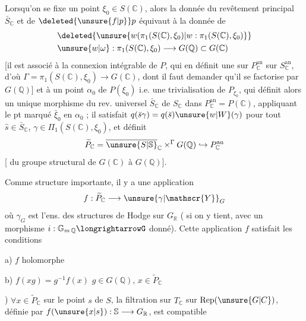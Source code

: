 Lorsqu'on se fixe un point $\xi_0\in S(\mathbb{C})$,\deleted{\unsure{$\xi$|,}} alors la donnée du revêtement principal $\bar S_{\mathbb{C}}$ et de $\deleted{\unsure{f|p}}p$ équivaut à la donnée de
\[
\begin{aligned}
&\deleted{\unsure{w(\pi_1(S(\mathbb{C}),\xi_0)|w:\pi_1(S(\mathbb{C}),\xi_0)}}\\
&\unsure{w|\omega}:\pi_1(S(\mathbb{C}),\xi_0)\longrightarrow G(\mathbb{Q})\subset G(\mathbb{C})
\end{aligned}
\]
[il est associé à la connexion intégrable de $P$, qui en définit une sur $P_{\mathbb{C}}^{\mathrm{an}}$ sur $S_{\mathbb{C}}^{\mathrm{an}}$, d'où $\Gamma=\pi_1(S(\mathbb{C}),\xi_0)\longrightarrow G(\mathbb{C})$, dont il faut demander qu'il se factorise par $G(\mathbb{Q})$] et à un  point $\alpha_0$ de $P(\xi_0)$ i.e. une trivialisation de $P_{\xi_0}$, qui définit alors un unique morphisme  du rev. universel $\bar S_{\mathbb{C}}$ de $S_{\mathbb{C}}$ dans $P_{\mathbb{C}}^{\mathrm{an}}=P(\mathbb{C})$, appliquant le pt marqué $\bar\xi_0$ en $\alpha_0$ ; il satisfait  $q(\bar s\gamma)=q(\bar s)\unsure{w|W}(\gamma)$ pour tout $\hat s\in\bar S_{\mathbb{C}}$,  $\gamma\in\Pi_1(S(\mathbb{C}),\xi_0)$,  et définit
\[
\widetilde P_{\mathbb{C}}=\overline{\unsure{S|\mathbb{S}}}_{\mathbb{C}}\mathbin{\times}^{\Gamma}G(\mathbb{Q})\hookrightarrow P_{\mathbb{C}}^{\mathrm{an}}
\]
[ du groupe structural  de $G(\mathbb{C})$ à $G(\mathbb{Q})$].

Comme structure importante, il y a une application
\[
f:\widetilde P_{\mathbb{C}}\longrightarrow\unsure{\gamma|\mathscr{Y}}_G
\]
où $\gamma_G$ est l'ens. des structures de Hodge sur $G_{\mathbb{R}}$ ( si on y tient, avec un morphisme $i:\mathbb{G}_{m\,\mathbb{Q}}\longrightarrowG$ donné). Cette application $f$ satisfait les conditions

a) $f$ holomorphe

b) $f(xg)=g^{-1}f(x)$ \qquad $g\in G(\mathbb{Q}),\,x\in\widetilde P_{\mathbb{C}}$

) $\forall x\in\widetilde P_{\mathbb{C}}$ sur le point $s$ de $S$, la  filtration sur $T_{\mathbb{C}}$ sur $\operatorname{Rep}(\unsure{G|C})$, définie par $f(\unsure{x|s}):\mathbb{S}\longrightarrow G_{\mathbb{R}}$, est compatible


